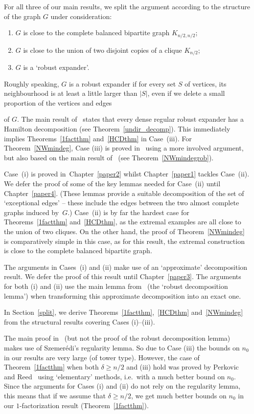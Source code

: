 \documentclass{memo-l}
\def\COMMENT#1{}
\numberwithin{section}{chapter}
\numberwithin{equation}{section}
\numberwithin{firstthm}{section}
\numberwithin{figure}{section}
\begin{document}
For all three of our main results, we split the argument according to the structure of the graph $G$ under consideration:
\begin{enumerate}
\item[{\rm (i)}] $G$ is  close to the complete balanced bipartite graph $K_{n/2,n/2}$;
\item[{\rm (ii)}] $G$ is close to the union of two disjoint copies of a clique $K_{n/2}$;
\item[{\rm (iii)}] $G$ is a `robust expander'.
\end{enumerate}
Roughly speaking, $G$ is a robust expander if for every set $S$ of vertices, its neighbourhood is at least a little larger than $|S|$,
even if we delete a small proportion of the vertices and edges%
   \COMMENT{Daniela: included vertices here}
of $G$.
The main result of~\cite{Kelly} states that every dense regular robust expander
has a Hamilton decomposition (see Theorem~\ref{undir_decomp}).
This immediately implies Theorems~\ref{1factthm} and~\ref{HCDthm} in Case~(iii).
For Theorem~\ref{NWmindeg}, Case (iii) is proved in~\cite{KLOmindeg} using a more involved argument, but also based on
the main result of~\cite{Kelly} (see Theorem~\ref{NWmindegrob}).

Case~(i) is proved in~Chapter~\ref{paper2} whilst Chapter~\ref{paper1} tackles Case~(ii).
We defer the proof of some of the key lemmas needed for Case~(ii) until Chapter~\ref{paper4}.
(These lemmas provide a suitable decomposition of the set of `exceptional edges' -- these include the edges between the two almost 
complete graphs induced by~$G$.)
Case~(ii) is by far the hardest case for Theorems~\ref{1factthm} and~\ref{HCDthm}, as the extremal examples are all close to the union of two 
cliques. On the other hand, the proof of Theorem~\ref{NWmindeg} is comparatively simple in this case, as for this result, 
the extremal construction is close to the complete balanced bipartite graph.

The arguments in Cases~(i) and (ii) 
make use of an `approximate' decomposition result.
We defer the proof of this result until Chapter~\ref{paper3}.
The arguments for both (i) and (ii) use the main lemma from~\cite{Kelly} (the `robust decomposition lemma') when transforming this approximate
decomposition into an exact one.

In Section~\ref{split}, we derive Theorems~\ref{1factthm},~\ref{HCDthm} and~\ref{NWmindeg} from the structural results covering 
Cases (i)--(iii). 

The main proof in~\cite{Kelly} (but not the proof of the robust decomposition lemma) makes use of Szemer\'edi's regularity lemma.
So due to Case (iii) the bounds on $n_0$ in our results are very large (of tower type).
However, the case of Theorem~\ref{1factthm} when both $\delta \ge n/2$ and (iii) hold was proved by Perkovic and Reed~\cite{reed}
using `elementary' methods, i.e.~with a much better bound on $n_0$. 
Since the arguments for Cases (i) and (ii) do not rely on the regularity lemma, this means that if we assume that $\delta \ge n/2$,
we get much better bounds on $n_0$ in our $1$-factorization result (Theorem~\ref{1factthm}).
\end{document}

